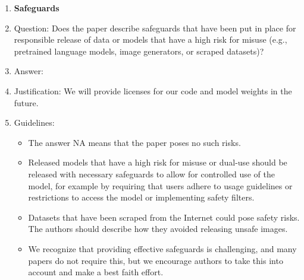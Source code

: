 \documentclass{article}
\begin{document}
\begin{enumerate}
\item {\bf Safeguards}
    \item[] Question: Does the paper describe safeguards that have been put in place for responsible release of data or models that have a high risk for misuse (e.g., pretrained language models, image generators, or scraped datasets)?
    \item[] Answer: \answerNo{} %
    \item[] Justification: We will provide licenses for our code and model weights in the future.
    \item[] Guidelines:
    \begin{itemize}
        \item The answer NA means that the paper poses no such risks.
        \item Released models that have a high risk for misuse or dual-use should be released with necessary safeguards to allow for controlled use of the model, for example by requiring that users adhere to usage guidelines or restrictions to access the model or implementing safety filters. 
        \item Datasets that have been scraped from the Internet could pose safety risks. The authors should describe how they avoided releasing unsafe images.
        \item We recognize that providing effective safeguards is challenging, and many papers do not require this, but we encourage authors to take this into account and make a best faith effort.
    \end{itemize}


\end{enumerate}
\end{document}
